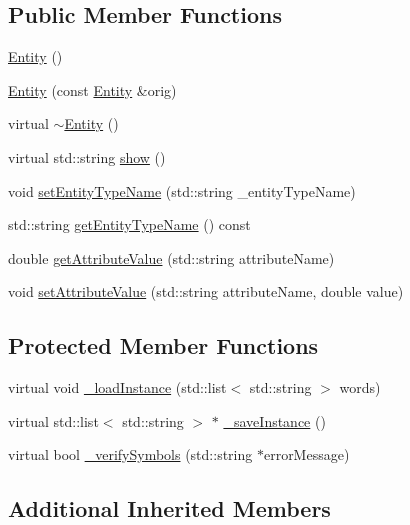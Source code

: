 \subsection*{Public Member Functions}
\begin{DoxyCompactItemize}
\item 
\hyperlink{class_entity_a980f368aa07ce358583982821533a54a}{Entity} ()
\item 
\hyperlink{class_entity_a9de139ff12775dd95fb80bec08247de7}{Entity} (const \hyperlink{class_entity}{Entity} \&orig)
\item 
virtual \hyperlink{class_entity_adf6d3f7cb1b2ba029b6b048a395cc8ae}{$\sim$\+Entity} ()
\item 
virtual std\+::string \hyperlink{class_entity_a86cc324050b451b31b134943e7978e36}{show} ()
\item 
void \hyperlink{class_entity_a40053760a2c84dd72fd5aeb425f6781d}{set\+Entity\+Type\+Name} (std\+::string \+\_\+entity\+Type\+Name)
\item 
std\+::string \hyperlink{class_entity_a860a6385aa2af6b8d205a8e3ea912c38}{get\+Entity\+Type\+Name} () const 
\item 
double \hyperlink{class_entity_aed93eae1f252705e713dd7f8019ace35}{get\+Attribute\+Value} (std\+::string attribute\+Name)
\item 
void \hyperlink{class_entity_ad1a2bc190ef151a4a5c7eff902ee468d}{set\+Attribute\+Value} (std\+::string attribute\+Name, double value)
\end{DoxyCompactItemize}
\subsection*{Protected Member Functions}
\begin{DoxyCompactItemize}
\item 
virtual void \hyperlink{class_entity_a51972e626aef5f92a10d5f800e323237}{\+\_\+load\+Instance} (std\+::list$<$ std\+::string $>$ words)
\item 
virtual std\+::list$<$ std\+::string $>$ $\ast$ \hyperlink{class_entity_a1569ba1b09e70e4769c5f02f611a8c61}{\+\_\+save\+Instance} ()
\item 
virtual bool \hyperlink{class_entity_a5a5fc79267b3671839597c99f8630a87}{\+\_\+verify\+Symbols} (std\+::string $\ast$error\+Message)
\end{DoxyCompactItemize}
\subsection*{Additional Inherited Members}


